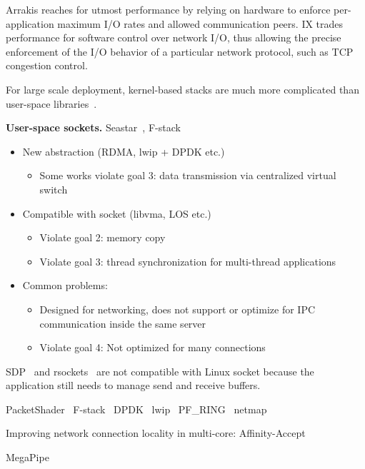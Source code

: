 Arrakis reaches for utmost performance by relying on hardware to enforce per-application maximum I/O rates and allowed communication peers. IX trades performance for software control over network I/O, thus allowing the precise enforcement of the I/O behavior of a particular network protocol, such as TCP congestion control.~\cite{bailis2016introducing}

For large scale deployment, kernel-based stacks are much more complicated than user-space libraries~\cite{andromeda}.

\textbf{User-space sockets.}
Seastar~\cite{seastar}, F-stack~\cite{fstack}


\begin{itemize}
	\item New abstraction (RDMA, lwip + DPDK etc.) 
	\begin{itemize}
		\item Some works violate goal 3: data transmission via centralized virtual switch 
	\end{itemize}
	\item Compatible with socket (libvma, LOS etc.) 
	\begin{itemize}
		\item Violate goal 2: memory copy 
		\item Violate goal 3: thread synchronization for multi-thread applications 
	\end{itemize}
	\item Common problems: 
	\begin{itemize}
		\item Designed for networking, does not support or optimize for IPC communication inside the same server 
		\item Violate goal 4: Not optimized for many connections 
	\end{itemize}
\end{itemize}


SDP~\cite{socketsdirect} and rsockets~\cite{rsockets} are not compatible with Linux socket because the application still needs to manage send and receive buffers.



PacketShader~\cite{han2010packetshader}
F-stack~\cite{fstack}
DPDK~\cite{dpdk} lwip~\cite{dunkels2001design}
PF\_RING~\cite{pf-ring}
netmap~\cite{rizzo2012netmap}

Improving network connection locality in multi-core:
Affinity-Accept~\cite{pesterev2012improving}


MegaPipe~\cite{han2012megapipe}

